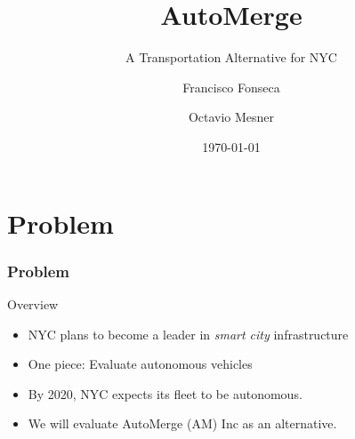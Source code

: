 \documentclass{beamer}
\title{AutoMerge}
\subtitle{A Transportation Alternative for NYC}
\date{\today}
\author[Fonseca Mesner]{Francisco Fonseca \and Octavio Mesner}
\institute{Carnegie Mellon University}
\begin{document}
\maketitle


\section{Problem}

\begin{frame}
  \frametitle{Problem}
  \begin{block}{Overview}
  \begin{itemize}
  \item NYC plans to become a leader in \emph{smart city} infrastructure
  \item One piece: Evaluate autonomous vehicles
  \item By 2020, NYC expects its fleet to be autonomous.
  \item We will evaluate AutoMerge (AM) Inc as an alternative.
  \end{itemize}
  \end{block}
\end{frame}
\end{document}
